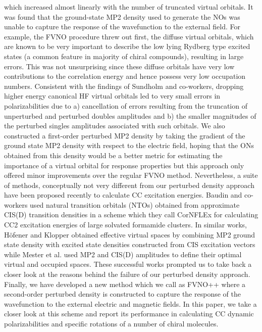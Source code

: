which increased almost linearly with the number of truncated virtual orbitals. 
It was found that the ground-state MP2 density used to generate the NOs was 
unable to capture the response of the wavefunction to the external field. 
For example, the FVNO procedure threw out first, the diffuse virtual 
orbitals, which are known to be very important to describe the low lying Rydberg type 
excited states (a common feature in majority of chiral compounds), 
resulting in large errors. This was not unsurprising since these diffuse 
orbitals have very low contributions to the correlation energy and hence 
possess very low occupation numbers. Consistent with the findings of Sundholm 
and co-workers\cite{Sundholm11}, dropping higher energy canonical HF 
virtual orbitals led to very small errors in polarizabilities due
to a) cancellation of errors resulting from the truncation of unperturbed 
and perturbed doubles amplitudes and b) the smaller magnitudes of the perturbed
singles amplitudes associated with such orbitals. 
We also constructed a first-order perturbed MP2 density by taking the gradient of the
ground state MP2 density with respect to the electric field, 
hoping that the ONs obtained from this density would be a better metric for 
estimating the importance of a virtual orbital 
for response properties but this approach only offered
minor improvements over the regular FVNO method. Nevertheless,
a suite of methods, conceptually not very different from our 
perturbed density approach have been proposed recently 
to calculate CC excitation energies. Baudin and co-workers 
used natural transition orbitals (NTOs) obtained from approximate 
CIS(D) transition densities in a scheme which they call CorNFLEx for 
calculating CC2 excitation energies of large solvated formamide 
clusters\cite{Baudin17}. In similar works, H{\"o}fener and Klopper 
obtained effective virtual spaces by combining MP2 
ground state density with excited state densities constructed from CIS 
excitation vectors\cite{HofenerKlopper17} while Mester et al. used MP2 and CIS(D) amplitudes 
to define their optimal virtual and occupied spaces\cite{Mester17,Mester18}.
These successful works prompted us to take back a closer look at the 
reasons behind the failure of our perturbed density approach. 
Finally, we have developed a new method which we call as FVNO++ 
where a second-order perturbed density is constructed to 
capture the response of the wavefunction to the external electric 
and magnetic fields. In this paper, we take a closer look at this 
scheme and report its performance in calculating CC dynamic 
polarizabilities and specific rotations of a number of chiral molecules.
